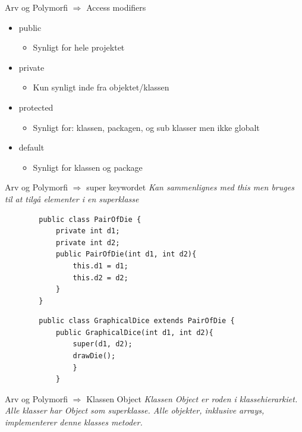 \documentclass[10pt,aspectratio=1610]{beamer}
\begin{document}
\begin{frame}{Arv og Polymorfi $\Rightarrow$ Access modifiers}
    \begin{itemize}
        \item public
        \begin{itemize}
            \item Synligt for hele projektet
        \end{itemize}
        \item private
        \begin{itemize}
            \item Kun synligt inde fra objektet/klassen
        \end{itemize}
        \item protected 
        \begin{itemize}
            \item Synligt for: klassen, packagen, og sub klasser men ikke globalt
        \end{itemize}
        \item default
        \begin{itemize}
            \item Synligt for klassen og package
        \end{itemize}
    \end{itemize}
\end{frame}

\begin{frame}[fragile]{Arv og Polymorfi $\Rightarrow$ super keywordet}
    \textit{Kan sammenlignes med \alert{this} men bruges til at tilgå elementer i en superklasse}
    \begin{lstlisting}
        public class PairOfDie {
            private int d1;
            private int d2;
            public PairOfDie(int d1, int d2){
                this.d1 = d1;
                this.d2 = d2;
            }
        }
    \end{lstlisting}
    \begin{lstlisting}
        public class GraphicalDice extends PairOfDie {
            public GraphicalDice(int d1, int d2){
                super(d1, d2);
                drawDie();
                }
            }
    \end{lstlisting}
\end{frame}


\begin{frame}{Arv og Polymorfi $\Rightarrow$ Klassen Object}
    \textit{Klassen Object er roden i klassehierarkiet. Alle klasser har Object som superklasse. Alle objekter, inklusive arrays, implementerer denne klasses metoder.}
\end{frame}
\end{document}
